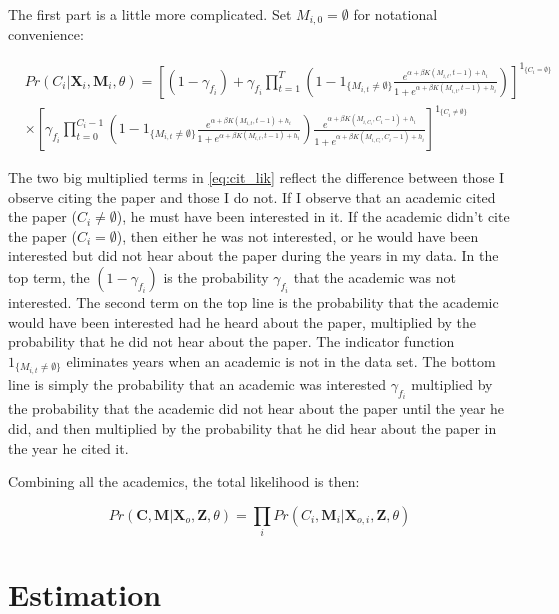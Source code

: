 \documentclass[]{article}
\begin{document}
The first part is a little more complicated. Set $M_{i,0} = \emptyset$ for notational convenience:

\begin{align}
    &Pr(C_i|\mathbf{X}_i, \mathbf{M}_i, \theta) = \left[\left(1 - \gamma_{f_{i}}\right) + \gamma_{f_{i}} \prod_{t=1}^T \left(1 - 1_{\{M_{i,t}\neq \emptyset\}} \frac{e^{\alpha + \beta K(M_{i,t},t-1) + h_i}}{1 + e^{\alpha + \beta K(M_{i,t},t-1) + h_i}}\right)\right]^{1_{\{C_i = \emptyset\}}} \nonumber \\
    &\times \left[\gamma_{f_{i}} \prod_{t=0}^{C_i - 1} \left(1 - 1_{\{M_{i,t}\neq \emptyset\}} \frac{e^{\alpha + \beta K(M_{i,t},t-1) + h_i}}{1 + e^{\alpha + \beta K(M_{i,t},t-1) + h_i}}\right) \frac{e^{\alpha + \beta K(M_{i,C_i},C_i-1) + h_i}}{1 + e^{\alpha + \beta K(M_{i,C_i},C_i-1) + h_i}}\right]^{1_{\{C_i \neq \emptyset\}}}
    \label{eq:cit_lik}
\end{align}

The two big multiplied terms in \eqref{eq:cit_lik} reflect the
difference between those I observe citing the paper and those I do not.
If I observe that an academic cited the paper ($C_i \neq \emptyset$), he must have been
interested in it. If the academic didn't cite the paper ($C_i = \emptyset$), then either he was not
interested, or he would have been interested but did not hear about the paper during 
the years in my data. In the top term, the $(1 - \gamma_{f_i})$ is the probability $\gamma_{f_i}$
that the academic was not interested. The second term on the top line is the probability that
the academic would have been interested had he heard about the paper,
multiplied by the probability that he did not hear about the paper.  The indicator function $1_{\{M_{i,t}\neq \emptyset\}}$
eliminates years when an academic is not in the data set.  The bottom line is
simply the probability that an academic was interested $\gamma_{f_i}$ multiplied
by the probability that the academic did not hear about the paper until
the year he did, and then multiplied by the probability that he did hear
about the paper in the year he cited it.

Combining all the academics, the total likelihood is then:

\begin{equation}
    Pr(\mathbf{C},\mathbf{M}|\mathbf{X}_o,\mathbf{Z},\theta) = \prod_i Pr(C_i,\mathbf{M}_i|\mathbf{X}_{o,i}, \mathbf{Z}, \theta)
    \label{eq:fulllik}
\end{equation}

\section{Estimation}
\end{document}
